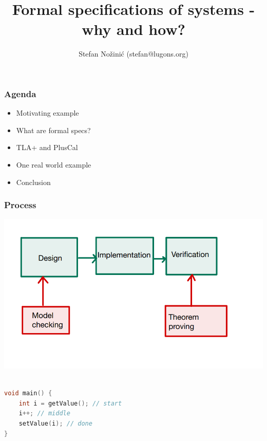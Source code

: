 \documentclass{beamer}
\begin{document}
\title{Formal specifications of systems - why and how?}
\author{Stefan Nožinić (stefan@lugons.org)}

\frame{
\titlepage
}

\begin{frame}
    \frametitle{Agenda}
    \begin{itemize}
        \item Motivating example
        \item What are formal specs? 
        \item TLA+ and PlusCal
        \item One real world example
        \item Conclusion
    \end{itemize}

\end{frame}


\begin{frame}
    \frametitle{Process}
    \includegraphics[width=\textwidth]{img/2.png}
\end{frame}

\begin{frame}[fragile]
	\begin{lstlisting}[language=C++]

void main() {
    int i = getValue(); // start
    i++; // middle
    setValue(i); // done
}

	\end{lstlisting}
	
\end{frame}
\end{document}

